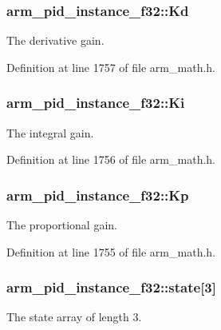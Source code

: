\hypertarget{structarm__pid__instance__f32_ad5b68fbf84d16188ae4747ff91f6f088}{
\subsubsection[{Kd}]{ arm\-\_\-pid\-\_\-instance\-\_\-f32\-::\-Kd}}\label{structarm__pid__instance__f32_ad5b68fbf84d16188ae4747ff91f6f088}
The derivative gain. 

Definition at line 1757 of file arm\-\_\-math.\-h.

\hypertarget{structarm__pid__instance__f32_ac0feffde05fe391eeab3bf78e953830a}{
\subsubsection[{Ki}]{ arm\-\_\-pid\-\_\-instance\-\_\-f32\-::\-Ki}}\label{structarm__pid__instance__f32_ac0feffde05fe391eeab3bf78e953830a}
The integral gain. 

Definition at line 1756 of file arm\-\_\-math.\-h.

\hypertarget{structarm__pid__instance__f32_aa9b9aa9e413c6cec376a9dddc9f01ebe}{
\subsubsection[{Kp}]{ arm\-\_\-pid\-\_\-instance\-\_\-f32\-::\-Kp}}\label{structarm__pid__instance__f32_aa9b9aa9e413c6cec376a9dddc9f01ebe}
The proportional gain. 

Definition at line 1755 of file arm\-\_\-math.\-h.

\hypertarget{structarm__pid__instance__f32_afd394e1e52fb1d526aa472c83b8f2464}{
\subsubsection[{state}]{ arm\-\_\-pid\-\_\-instance\-\_\-f32\-::state\mbox{[}3\mbox{]}}}\label{structarm__pid__instance__f32_afd394e1e52fb1d526aa472c83b8f2464}
The state array of length 3. 

